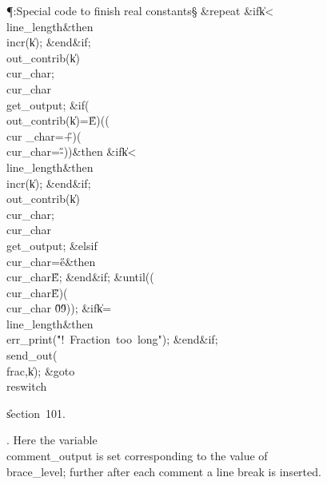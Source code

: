 \Y\P\?\4:Special code to finish real constants\X\S\?\6
\1\&{repeat}\6
\&{if}\1\1\8\|k\?<\?\\{line\_length}\2\8\&{then}\6
\\{incr}\?\1(\?\|k\?\2)\?;\2\6
\&{end}\8\2\&{if}\1;\6
\\{out\_contrib}\?\1(\?\|k\?\2)\K\?\\{cur\_char};\5
\\{cur\_char}\?\K\?\\{get\_output};\6
\&{if}\1\1\?\8\1(\?\\{out\_contrib}\?\1(\?\|k\?\2)=\?\H{E}\?\2)\W\1(\1(\?\\{cur%
\_char}\?=\?\H{+}\?\2)\V\1(\?\\{cur\_char}\?=\?\H{-}\?\2)\2)\?\2\8\&{then}\6
\&{if}\1\1\8\|k\?<\?\\{line\_length}\2\8\&{then}\6
\\{incr}\?\1(\?\|k\?\2)\?;\2\6
\&{end}\8\2\&{if}\1;\6
\\{out\_contrib}\?\1(\?\|k\?\2)\K\?\\{cur\_char};\5
\\{cur\_char}\?\K\?\\{get\_output};\6
\4\&{elsif}\1\8\\{cur\_char}\?=\?\H{e}\2\8\&{then}\6
\\{cur\_char}\?\K\?\H{E};\2\6
\&{end}\8\2\&{if}\1;\2\6
\&{until}\?\8\1(\1(\?\\{cur\_char}\?\I\?\H{E}\?\2)\W\1(\?\\{cur\_char}\?\notin%
\?\H{0}\?\to\?\H{9}\?\2)\2)\?;\6
\&{if}\1\1\8\|k\?=\?\\{line\_length}\2\8\&{then}\6
\\{err\_print}\?\1(\?\.{"!\ Fraction\ too\ long"}\?\2)\?;\2\6
\&{end}\8\2\&{if}\1;\6
\\{send\_out}\?\1(\?\\{frac}\?,\?\|k\?\2)\?;\5
\&{goto}\8\\{reswitch}\par
\U section~101.\fi

. Here the variable \\{comment\_output} is set corresponding to the value
of
\\{brace\_level}; further after each comment a line break is inserted.

